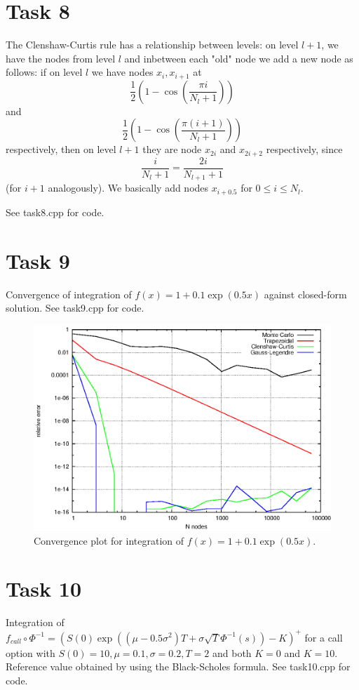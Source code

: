 \documentclass[]{article}
\begin{document}
\clearpage
\section*{Task 8}The Clenshaw-Curtis rule has a relationship between levels: on level
$l+1$, we have the nodes from level $l$ and inbetween each "old" node we add a
new node as follows: if on level $l$ we have nodes $x_i,x_{i+1}$ at
\[ \dfrac{1}{2}\left(1-\cos\left(\dfrac{\pi i}{N_l+1}\right)\right)\]
 and
\[\dfrac{1}{2}\left(1-\cos\left(\dfrac{\pi(i+1)}{N_l+1}\right)\right)\]
 respectively, then on level $l+1$ they are node $x_{2i}$ and $x_{2i+2}$ respectively, since
\[\dfrac{i}{N_l+1}=\dfrac{2i}{N_{l+1}+1}\]
 (for $i+1$ analogously). We basically add nodes  $x_{i+0.5}$ for $0\le i \le
 N_l$. 
 
 See task8.cpp for code.

\section*{Task 9}
Convergence of integration of $f(x)=1+0.1\exp(0.5x)$ against closed-form solution. See task9.cpp for code.
\begin{figure}[!ht]
\centering
\includegraphics{task9Plot}
\caption{Convergence plot for integration of $f(x)=1+0.1\exp(0.5x)$.}
\label{fig:Task9}
\end{figure}
\clearpage

\section*{Task 10}
Integration of $f_{call}\circ \Phi^{-1}=(S(0)\exp((\mu-0.5\sigma^2)T+\sigma\sqrt{T}\Phi^{-1}(s))-K)^+$ for a call option with $S(0)=10,\mu=0.1,\sigma=0.2,T=2$ and both $K=0$ and $K=10$. Reference value obtained by using the Black-Scholes formula. See task10.cpp for code.
\end{document}
